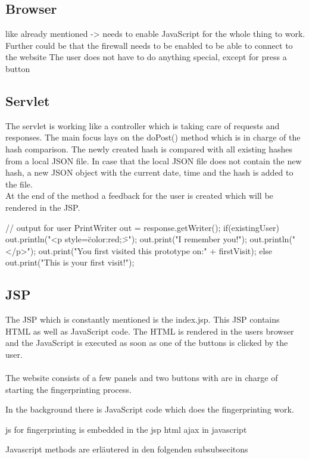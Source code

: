 \subsection{Browser}
like already mentioned -> needs to enable JavaScript for the whole thing to work.
Further could be that the firewall needs to be enabled to be able to connect to the website
The user does not have to do anything special, except for press a button


\subsection{Servlet}
The servlet is working like a controller which is taking care of requests and responses. The main focus lays on the doPost() method which is in charge of the hash comparison. The newly created hash is compared with all existing hashes from a local JSON file. In case that the local JSON file does not contain the new hash, a new JSON object with the current date, time and the hash is added to the file.\\
At the end of the method a feedback for the user is created which will be rendered in the JSP.

\begin{JavaCode}
// output for user
PrintWriter out = response.getWriter();
if(existingUser) {
	out.println("<p style=\"color:red;\">");			
	out.print("I remember you!");
	out.println("</p>");
	out.print("You first visited this prototype on:" + firstVisit);
}
else {
	out.print("This is your first visit!");
}
\end{JavaCode}


\subsection{JSP}
The JSP which is constantly mentioned is the index.jsp. This JSP contains HTML as well as JavaScript code. The HTML is rendered in the users browser and the JavaScript is executed as soon as one of the buttons is clicked by the user.\\\\
The website consists of a few panels and two buttons with are in charge of starting the fingerprinting process.

In the background there is JavaScript code which does the fingerprinting work.

js for fingerprinting is embedded in the jsp
html
ajax in javascript

Javascript methods are erläutered in den folgenden subsubsecitons


